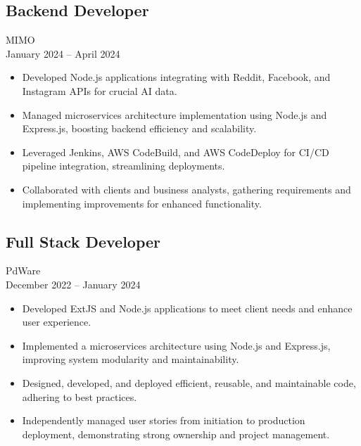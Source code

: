 \documentclass[10pt, letterpaper]{article}
\begin{document}
        \subsection{Backend Developer}
            MIMO \\
            January 2024 – April 2024
            \begin{itemize}[leftmargin=*]
                \item Developed Node.js applications integrating with Reddit, Facebook, and Instagram APIs for crucial AI data.
                \item Managed microservices architecture implementation using Node.js and Express.js, boosting backend efficiency and scalability.
                \item Leveraged Jenkins, AWS CodeBuild, and AWS CodeDeploy for CI/CD pipeline integration, streamlining deployments.
                \item Collaborated with clients and business analysts, gathering requirements and implementing improvements for enhanced functionality.
            \end{itemize}
        \subsection{Full Stack Developer}
            PdWare \\
            December 2022 – January 2024
            \begin{itemize}[leftmargin=*]
                \item Developed ExtJS and Node.js applications to meet client needs and enhance user experience.
                \item Implemented a microservices architecture using Node.js and Express.js, improving system modularity and maintainability.
                \item Designed, developed, and deployed efficient, reusable, and maintainable code, adhering to best practices.
                \item Independently managed user stories from initiation to production deployment, demonstrating strong ownership and project management.
            \end{itemize}
\end{document}

